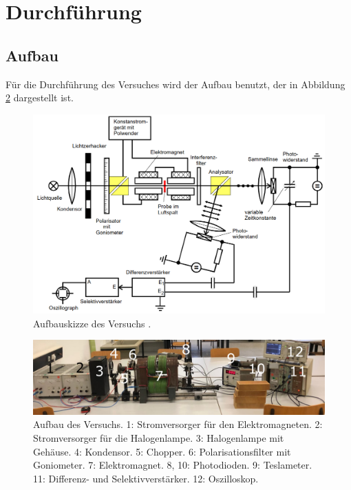 \section{Durchführung}
\label{sec:Durchführung}

\subsection{Aufbau}

Für die Durchführung des Versuches wird der Aufbau benutzt, der in Abbildung \ref{fig:aufbau}
dargestellt ist. 

\begin{figure}[H]
    \centering
    \includegraphics[width=\textwidth]{Bilder/aufbau.png}
    \caption{Aufbauskizze des Versuchs \cite{faradayeffekt}.}
    \label{fig:aufbau}
\end{figure}

\begin{figure}[H]
    \centering
    \includegraphics[width=\textwidth]{Bilder/image1.png}
    \caption{Aufbau des Versuchs. 1: Stromversorger für den Elektromagneten. 2: Stromversorger für die Halogenlampe. 3: Halogenlampe mit Gehäuse. 4: Kondensor. 5: Chopper. 6: Polarisationsfilter mit Goniometer. 7: Elektromagnet. 8, 10: Photodioden. 9: Teslameter. 11: Differenz- und Selektivverstärker. 12: Oszilloskop.}
    \label{fig:aufbau}
\end{figure}

